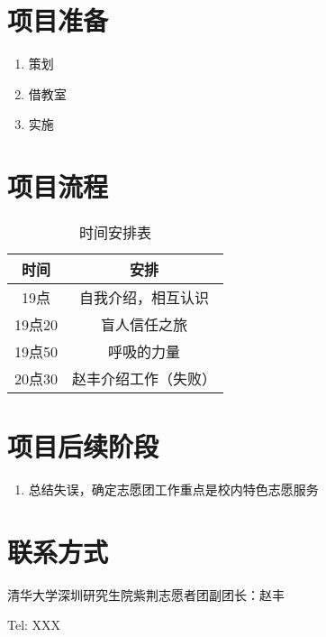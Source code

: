 \documentclass[12pt]{ctexart}
\begin{document}
\section{项目准备}
\begin{enumerate}
\item 策划
\item 借教室
\item 实施
\end{enumerate}
\section{项目流程}
\begin{table}[!ht]
\centering
\begin{tabular}{|c|c|}
\hline
时间 & 安排 \\
\hline
19点  & 自我介绍，相互认识 \\
\hline
19点20 &  盲人信任之旅  \\
\hline
19点50  & 呼吸的力量  \\
\hline
20点30  & 赵丰介绍工作（失败） \\
\hline
\end{tabular}
\caption{时间安排表}\label{route}
\end{table}



\section{项目后续阶段}
\begin{enumerate}
\item 总结失误，确定志愿团工作重点是校内特色志愿服务
\end{enumerate}
\section{联系方式}
清华大学深圳研究生院紫荆志愿者团副团长：赵丰

Tel: XXX
\end{document}
